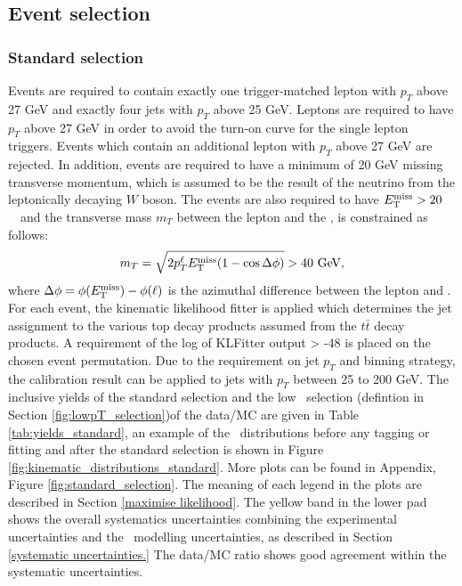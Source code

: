 \documentclass[letterpaper,12pt]{article}
\begin{document}
\subsection{Event selection}
\label{Event selection}


\subsubsection{Standard selection}
\label{standard selection}
Events are required to contain exactly one trigger-matched 
lepton with $p_{T}$ above 27 GeV and exactly four jets with 
$p_{T}$ above 25 GeV. Leptons are required to have $p_{T}$ 
above 27 GeV in order to avoid the turn-on curve for the 
single lepton triggers. Events which contain an additional 
lepton with $p_T$ above 27 GeV are rejected. 
In addition, events are required 
to have a minimum of 20 GeV missing transverse momentum, which is 
assumed to be the result of the neutrino from the leptonically 
decaying $W$ boson. 
The events are also required to have $E_{\mathrm T}^{\mathrm{miss}} > 20$~\GeV\ and the transverse
mass $m_T$ between the lepton and the \MET, is
constrained as follows:
\[ m_T = \sqrt{2 p_T^\ell E_{\mathrm T}^{\mathrm{miss}} (1-\cos\Delta\phi)} > 40~\text{Ge\kern -0.1em V},\]
where $\Delta\phi = \phi(E_{\mathrm T}^{\mathrm{miss}})-\phi(\ell)$ is the azimuthal difference between
the lepton and \MET.
For each event, the kinematic likelihood fitter 
is applied which determines the jet assignment to the various top 
decay products assumed from the $t\bar{t}$ decay products. 
A requirement of the log of KLFitter output > -48 is placed 
on the chosen event permutation. 
Due to the requirement on jet $p_T$ and binning strategy, the calibration 
result can be applied to jets with $p_{T}$ between 25 to 200 GeV. 
The inclusive yields of the standard selection and the low \pt\ selection 
(defintion in Section \ref{fig:lowpT_selection})of the data/MC are 
given in Table \ref{tab:yields_standard}, an example of 
the \pt\ distributions before any tagging or fitting and 
after the standard selection is shown in Figure \ref{fig:kinematic_distributions_standard}. 
More plots can be found in Appendix, Figure \ref{fig:standard_selection}.
The meaning of each legend in the plots are described in Section \ref{maximise likelihood}. 
The yellow band in the lower pad shows the overall systematics uncertainties combining the 
experimental uncertainties and the \ttbar\ modelling uncertainties, as described in 
Section \ref{systematic uncertainties.} The data/MC ratio shows good agreement 
within the systematic uncertainties. 
\end{document}
